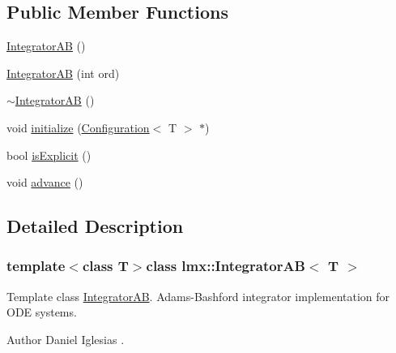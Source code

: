 \subsection*{Public Member Functions}
\begin{DoxyCompactItemize}
\item 
\hyperlink{classlmx_1_1IntegratorAB_a4e8d94eeab22156cf7b5a14d4f29fae4}{Integrator\-A\-B} ()
\item 
\hyperlink{classlmx_1_1IntegratorAB_a6f71ab0692e6ab5179fe6a0d1c7b881c}{Integrator\-A\-B} (int ord)
\item 
\hyperlink{classlmx_1_1IntegratorAB_a1ef71aac011f8b89402abade0aceff41}{$\sim$\-Integrator\-A\-B} ()
\item 
void \hyperlink{classlmx_1_1IntegratorAB_a6aa7035ce0b6a896054175a32a0baf60}{initialize} (\hyperlink{classlmx_1_1Configuration}{Configuration}$<$ T $>$ $\ast$)
\item 
bool \hyperlink{classlmx_1_1IntegratorAB_a20e20c85eea134b3d831372fd16b0bec}{is\-Explicit} ()
\item 
void \hyperlink{classlmx_1_1IntegratorAB_a1fb950b1126f4db82df1e49dfb832b42}{advance} ()
\end{DoxyCompactItemize}


\subsection{Detailed Description}
\subsubsection*{template$<$class T$>$class lmx\-::\-Integrator\-A\-B$<$ T $>$}

Template class \hyperlink{classlmx_1_1IntegratorAB}{Integrator\-A\-B}. Adams-\/\-Bashford integrator implementation for O\-D\-E systems. 

\begin{DoxyAuthor}{Author}
Daniel Iglesias . 
\end{DoxyAuthor}


